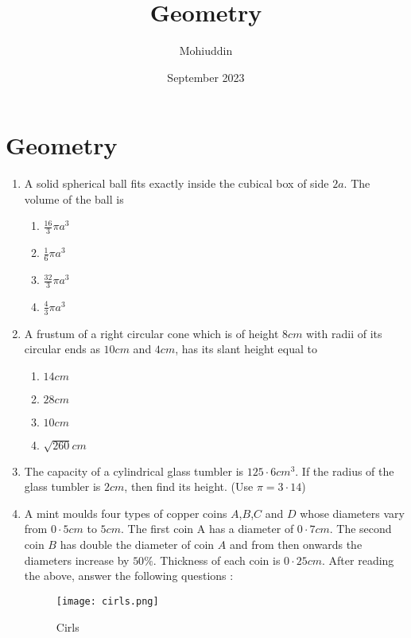 \documentclass{article}
\title{Geometry}
\author{Mohiuddin}
\date{September 2023}
\begin{document}
\maketitle

\section{Geometry}
\begin{enumerate}
    \item A solid spherical ball fits exactly inside the cubical box of side $2a$. The volume of the ball is 
\begin{enumerate}
    \item $\frac{16}{3}\pi a^3$
    \item $\frac{1}{6}\pi a^3$
    \item $\frac{32}{3}\pi a^3$
        \item $\frac{4}{3}\pi a^3$
    \end{enumerate}
    
    \item A frustum of a right circular cone which is of height $8 cm$ with radii of its circular ends as $10 cm$ and $4 cm$, has its slant height equal to 
\begin{enumerate}
    \item $ 14 cm$
    \item $28 cm$
    \item $10 cm$
    \item $\sqrt{260}cm$
    \end{enumerate}
    
    \item The capacity of a cylindrical glass tumbler is $125\cdot6 cm^3$. If the radius of the glass tumbler is $2 cm$, then find its height. (Use $\pi= 3\cdot14$)
\newpage
\item A mint moulds four types of copper coins $A$,$B$,$C$ and $D$ whose diameters vary from $0\cdot5 cm$ to $5 cm$. The first coin A has a diameter of $0\cdot7 cm$. The second coin $B$ has double the diameter of coin $A$ and from then onwards the diameters increase by $50\%$. Thickness of each coin is $0\cdot25 cm$.
    After reading the above, answer the following questions :
\begin{figure}[H]
    \centering
    \texttt{[image: cirls.png]}
    \caption{Cirls}
    \label{fig:copper coins}
    \end{figure}
      

\end{enumerate}
\end{document}
